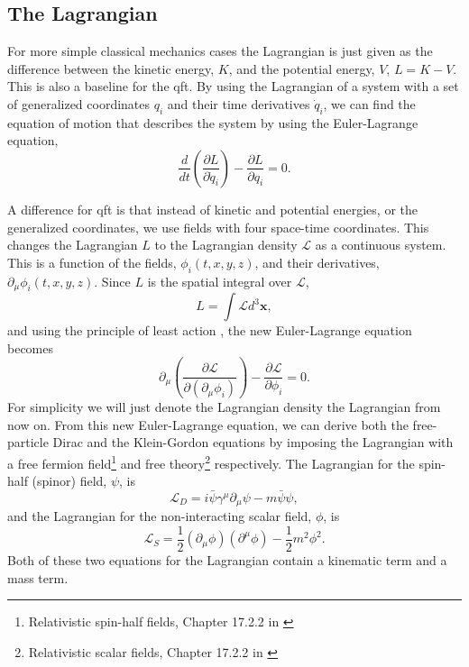 \documentclass[a4paper, american, 12pt]{report}
\begin{document}
	
	\subsection{The Lagrangian}
	\label{subsect:Theory-Lagrangian}
	For more simple classical mechanics cases the Lagrangian is just given as the difference between the kinetic energy, $K$, and the potential energy, $V$, $L=K-V$. This is also a baseline for the \acrshort{qft}.
	By using the Lagrangian of a system with a set of generalized coordinates $q_i$ and their time derivatives $\dot{q}_i$, we can find the equation of motion that describes the system by using the Euler-Lagrange equation,
	\begin{equation}
	\label{eq:Euler-Lagrange}
		\frac{d}{dt}\left(\frac{\partial L}{\partial \dot{q}_i}\right) - \frac{\partial L}{\partial q_i}=0.
	\end{equation} 
	
	A difference for \acrshort{qft} is that instead of kinetic and potential energies, or the generalized coordinates, we use fields with four space-time coordinates. This changes the Lagrangian $L$ to the Lagrangian density $\mathcal{L}$ as a continuous system. This is a function of the fields, $\phi_i(t,x,y,z)$, and their derivatives, $\partial_{\mu}\phi_i(t,x,y,z)$. Since $L$ is the spatial integral over $\mathcal{L}$, 
	\begin{equation}
	\label{eq:L_int}
		L=\int\mathcal{L}d^3\textbf{x},
	\end{equation} 
	and using the principle of least action \cite{least_action}, the new Euler-Lagrange equation becomes 
	\begin{equation}
	\label{eq:Euler-Lagrange-QFT}
		\partial_{\mu}\left(\frac{\partial \mathcal{L}}{\partial (\partial_{\mu}\phi_i)}\right) - \frac{\partial \mathcal{L}}{\partial \phi_i}=0.
	\end{equation}
	For simplicity we will just denote the Lagrangian density the Lagrangian from now on. From this new Euler-Lagrange equation, we can derive both the free-particle Dirac and the Klein-Gordon equations by imposing the Lagrangian with a free fermion field\footnote{Relativistic spin-half fields, Chapter 17.2.2 in \citet{thomson2013modern}} and free theory\footnote{Relativistic scalar fields, Chapter 17.2.2 in \citet{thomson2013modern}} respectively. The Lagrangian for the spin-half (spinor) field, $\psi$, is
	\begin{equation}
	\label{eq:L_spinor}
		\mathcal{L}_D=i\bar{\psi}\gamma^{\mu}\partial_{\mu}\psi-m\bar{\psi}\psi,
	\end{equation}
	and the Lagrangian for the non-interacting scalar field, $\phi$, is
	\begin{equation}
	\label{eq:L_scalar}
		\mathcal{L}_S=\frac{1}{2}(\partial_{\mu}\phi)(\partial^{\mu}\phi)-\frac{1}{2}m^2\phi^2.
	\end{equation}
	Both of these two equations for the Lagrangian contain a kinematic term and a mass term. 
	
\end{document}
